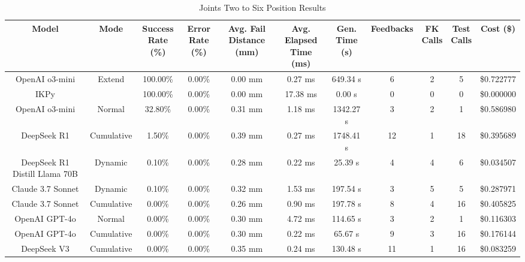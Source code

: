 \begin{table}[H]
\tiny
\renewcommand{\arraystretch}{1.2}
\caption{Joints Two to Six Position Results}
\begin{center}
\begin{tabular}{|c|c|c|c|c|c|c|c|c|c|c|}
    \hline
    \textbf{Model} & 
    \textbf{Mode} & 
    \makecell{\textbf{Success}\\\textbf{Rate (\%)}} &
    \makecell{\textbf{Error}\\\textbf{Rate (\%)}} &
    \makecell{\textbf{Avg. Fail}\\\textbf{Distance (mm)}} &
    \makecell{\textbf{Avg. Elapsed}\\\textbf{Time (ms)}} &
    \makecell{\textbf{Gen.}\\\textbf{Time (s)}} &
    \textbf{Feedbacks} &
    \makecell{\textbf{FK}\\\textbf{Calls}} &
    \makecell{\textbf{Test}\\\textbf{Calls}} &
    \textbf{Cost (\$)} \\
    \hline
    OpenAI o3-mini & Extend & 100.00\% & 0.00\% & 0.00 mm & 0.27 ms & 649.34 s & 6 & 2 & 5 & \$0.722777 \\
    \hline
    IKPy &  & 100.00\% & 0.00\% & 0.00 mm & 17.38 ms & 0.00 s & 0 & 0 & 0 & \$0.000000 \\
    \hline
    OpenAI o3-mini & Normal & 32.80\% & 0.00\% & 0.31 mm & 1.18 ms & 1342.27 s & 3 & 2 & 1 & \$0.586980 \\
    \hline
    DeepSeek R1 & Cumulative & 1.50\% & 0.00\% & 0.39 mm & 0.27 ms & 1748.41 s & 12 & 1 & 18 & \$0.395689 \\
    \hline
    DeepSeek R1 Distill Llama 70B & Dynamic & 0.10\% & 0.00\% & 0.28 mm & 0.22 ms & 25.39 s & 4 & 4 & 6 & \$0.034507 \\
    \hline
    Claude 3.7 Sonnet & Dynamic & 0.10\% & 0.00\% & 0.32 mm & 1.53 ms & 197.54 s & 3 & 5 & 5 & \$0.287971 \\
    \hline
    Claude 3.7 Sonnet & Cumulative & 0.00\% & 0.00\% & 0.26 mm & 0.90 ms & 197.78 s & 8 & 4 & 16 & \$0.405825 \\
    \hline
    OpenAI GPT-4o & Normal & 0.00\% & 0.00\% & 0.30 mm & 4.72 ms & 114.65 s & 3 & 2 & 1 & \$0.116303 \\
    \hline
    OpenAI GPT-4o & Cumulative & 0.00\% & 0.00\% & 0.30 mm & 0.22 ms & 65.67 s & 9 & 3 & 16 & \$0.176144 \\
    \hline
    DeepSeek V3 & Cumulative & 0.00\% & 0.00\% & 0.35 mm & 0.24 ms & 130.48 s & 11 & 1 & 16 & \$0.083259 \\

\end{tabular}
\end{center}
\end{table}
